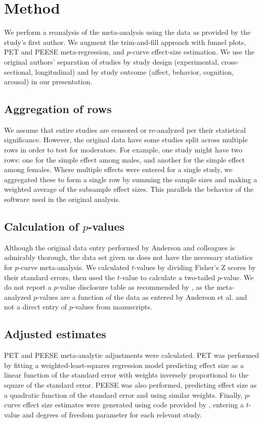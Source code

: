\documentclass[man]{apa6}
\begin{document}
\section{Method}
We perform a reanalysis of the \citet{Anderson:etal:2010} meta-analysis using the data as provided by the study's first author.  We augment the trim-and-fill approach with funnel plots, PET and PEESE meta-regression, and $p$-curve effect-size estimation. We use the original authors' separation of studies by study design (experimental, cross-sectional, longitudinal) and by study outcome (affect, behavior, cognition, arousal) in our presentation.

\subsection{Aggregation of rows}
We assume that entire studies are censored or re-analyzed per their statistical significance. However, the original data have some studies split across multiple rows in order to test for moderators. For example, one study might have two rows: one for the simple effect among males, and another for the simple effect among females. Where multiple effects were entered for a single study, we aggregated these to form a single row by summing the sample sizes and making a weighted average of the subsample effect sizes. This parallels the behavior of the software used in the original analysis. 

\subsection{Calculation of $p$-values}
Although the original data entry performed by Anderson and colleagues is admirably thorough, the data set given us does not have the necessary statistics for $p$-curve meta-analysis. We calculated $t$-values by dividing Fisher's Z scores by their standard errors, then used the $t$-value to calculate a two-tailed $p$-value. We do not report a $p$-value disclosure table as recommended by \citet{Simonsohn:etal:2014}, as the meta-analyzed $p$-values are a function of the data as entered by Anderson et al. and not a direct entry of $p$-values from manuscripts.

\subsection{Adjusted estimates}
PET and PEESE meta-analytic adjustments were calculated. PET was performed by fitting a weighted-least-squares regression model predicting effect size as a linear function of the standard error with weights inversely proportional to the square of the standard error. PEESE was also performed, predicting effect size as a quadratic function of the standard error and using similar weights. Finally, $p$-curve effect size estimates were generated using code provided by \citet{Simonsohn:etal:2014}, entering a $t$-value and degrees of freedom parameter for each relevant study.
\end{document}
